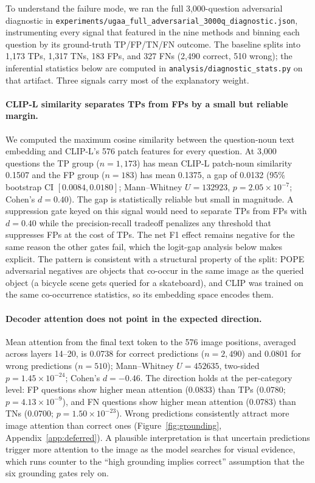 \documentclass{article}
\begin{document}
To understand the failure mode, we ran the full 3,000-question
adversarial diagnostic in
\texttt{experiments/ugaa\_full\_adversarial\_3000q\_diagnostic.json},
instrumenting every signal that featured in the nine methods and
binning each question by its ground-truth TP/FP/TN/FN outcome. The
baseline splits into 1{,}173 TPs, 1{,}317 TNs, 183 FPs, and 327 FNs
(2{,}490 correct, 510 wrong); the inferential statistics below are
computed in \texttt{analysis/diagnostic\_stats.py} on that artifact.
Three signals carry most of the explanatory weight.

\paragraph{CLIP-L similarity separates TPs from FPs by a small but
reliable margin.} We computed the maximum cosine similarity between the
question-noun text embedding and CLIP-L's 576 patch features for every
question. At 3,000 questions the TP group ($n{=}1{,}173$) has mean
CLIP-L patch-noun similarity 0.1507 and the FP group ($n{=}183$) has
mean 0.1375, a gap of 0.0132 (95\% bootstrap CI $[0.0084, 0.0180]$;
Mann--Whitney $U=132923$, $p=2.05 \times 10^{-7}$; Cohen's $d=0.40$).
The gap is statistically reliable but small in magnitude. A suppression
gate keyed on this signal would need to separate TPs from FPs with
$d=0.40$ while the precision-recall tradeoff penalizes any threshold
that suppresses FPs at the cost of TPs. The net F1 effect remains
negative for the same reason the other gates fail, which the logit-gap
analysis below makes explicit. The pattern is consistent with a
structural property of the split: POPE adversarial negatives are
objects that co-occur in the same image as the queried object (a
bicycle scene gets queried for a skateboard), and CLIP was trained on
the same co-occurrence statistics, so its embedding space encodes them.

\paragraph{Decoder attention does not point in the expected direction.}
Mean attention from the final text token to the 576 image positions,
averaged across layers 14--20, is 0.0738 for correct predictions
($n{=}2{,}490$) and 0.0801 for wrong predictions ($n{=}510$);
Mann--Whitney $U=452635$, two-sided $p=1.45 \times 10^{-24}$; Cohen's
$d=-0.46$. The direction holds at the per-category level: FP questions
show higher mean attention (0.0833) than TPs (0.0780;
$p=4.13 \times 10^{-9}$), and FN questions show higher mean attention
(0.0783) than TNs (0.0700; $p=1.50 \times 10^{-23}$). Wrong predictions
consistently attract more image attention than correct ones
(Figure~\ref{fig:grounding}, Appendix~\ref{app:deferred}). A plausible
interpretation is that uncertain predictions trigger more attention to
the image as the model searches for visual evidence, which runs counter
to the ``high grounding implies correct'' assumption that the six
grounding gates rely on.
\end{document}
